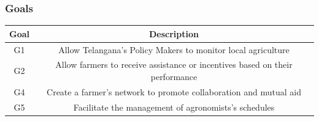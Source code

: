 \documentclass[10pt]{article}
\begin{document}
\subsubsection{Goals}
    \begin{center}
        \vspace{0.5cm}
        \begin{tabular}{|c c|} 
        \hline
        Goal & Description \\ 
        \hline\hline
        G1 & Allow Telangana's Policy Makers to monitor local agriculture\\ 
        \hline
        G2 & Allow farmers to receive assistance or incentives based on their performance\\ 
        \hline
        G4 & Create a farmer's network to promote collaboration and mutual aid \\ 
        \hline
        G5 & Facilitate the management of agronomists's schedules \\ 
        \hline
        \end{tabular}
    \end{center}
\end{document}
